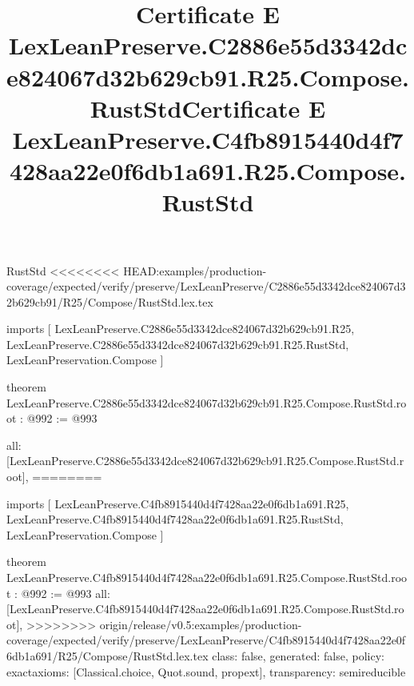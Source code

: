 \begin{lexlean}{RustStd}
<<<<<<<< HEAD:examples/production-coverage/expected/verify/preserve/LexLeanPreserve/C2886e55d3342dce824067d32b629cb91/R25/Compose/RustStd.lex.tex
\title{Certificate E LexLeanPreserve.C2886e55d3342dce824067d32b629cb91.R25.Compose.RustStd}
\begin{coremodule}
imports [
  LexLeanPreserve.C2886e55d3342dce824067d32b629cb91.R25,
  LexLeanPreserve.C2886e55d3342dce824067d32b629cb91.R25.RustStd,
  LexLeanPreservation.Compose
]

theorem LexLeanPreserve.C2886e55d3342dce824067d32b629cb91.R25.Compose.RustStd.root : @992 := @993 {
  all: [LexLeanPreserve.C2886e55d3342dce824067d32b629cb91.R25.Compose.RustStd.root],
========
\title{Certificate E LexLeanPreserve.C4fb8915440d4f7428aa22e0f6db1a691.R25.Compose.RustStd}
\begin{coremodule}
imports [
  LexLeanPreserve.C4fb8915440d4f7428aa22e0f6db1a691.R25,
  LexLeanPreserve.C4fb8915440d4f7428aa22e0f6db1a691.R25.RustStd,
  LexLeanPreservation.Compose
]

theorem LexLeanPreserve.C4fb8915440d4f7428aa22e0f6db1a691.R25.Compose.RustStd.root : @992 := @993 {
  all: [LexLeanPreserve.C4fb8915440d4f7428aa22e0f6db1a691.R25.Compose.RustStd.root],
>>>>>>>> origin/release/v0.5:examples/production-coverage/expected/verify/preserve/LexLeanPreserve/C4fb8915440d4f7428aa22e0f6db1a691/R25/Compose/RustStd.lex.tex
  class: false,
  generated: false,
  policy: exact{axioms: [Classical.choice, Quot.sound, propext]},
  transparency: semireducible
}


\end{coremodule}}
\end{coremodule}
\end{lexlean}
